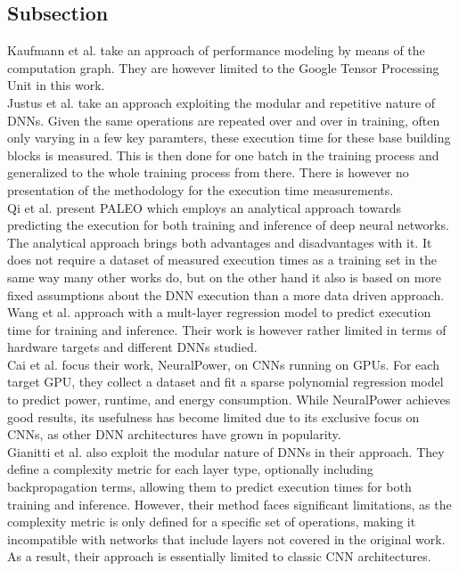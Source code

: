 \subsection{Subsection}
Kaufmann et al. take an approach of performance modeling by means of the computation graph. They are
however limited to the Google Tensor Processing Unit in this work. \\
Justus et al. take an approach exploiting the modular and repetitive nature of DNNs. Given the same operations
are repeated over and over in training, often only varying in a few key paramters, these execution time for
these base building blocks is measured. This is then done for one batch in the training process and
generalized to the whole training process from there. There is however no presentation of the 
methodology for the execution time measurements. \\
Qi et al. present PALEO which employs an analytical approach towards predicting the execution for both
training and inference of deep neural networks. The analytical approach brings both advantages and disadvantages
with it. It does not require a dataset of measured execution times as a training set in the same way many 
other works do, but on the other hand it also is based on more fixed assumptions about the DNN execution 
than a more data driven approach. \\
Wang et al. approach with a mult-layer regression model to predict execution time for training and inference.
Their work is however rather limited in terms of hardware targets and different DNNs studied. \\
Cai et al. focus their work, NeuralPower, on CNNs running on GPUs. For each target GPU, they collect
a dataset and fit a sparse polynomial regression model to predict power, runtime, and energy consumption.
While NeuralPower achieves good results, its usefulness has become limited due to its exclusive focus on 
CNNs, as other DNN architectures have grown in popularity. \\
Gianitti et al. also exploit the modular nature of DNNs in their approach. They define a complexity
metric for each layer type, optionally including backpropagation terms, allowing them to predict
execution times for both training and inference. However, their method faces significant limitations,
as the complexity metric is only defined for a specific set of operations, making it incompatible with
networks that include layers not covered in the original work. As a result, their approach is essentially
limited to classic CNN architectures. \\
